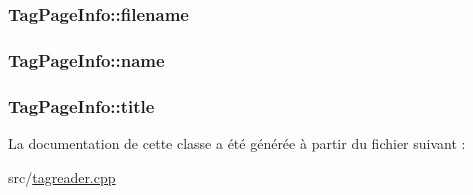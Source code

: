 \subsubsection[{filename}]{ Tag\+Page\+Info\+::filename}\label{class_tag_page_info_a3bf13922e2f0a86a2e23c3ccb72c84df}
\hypertarget{class_tag_page_info_a2e57641a6ce6bd580af7e2b432ed7ca5}{}
\subsubsection[{name}]{ Tag\+Page\+Info\+::name}\label{class_tag_page_info_a2e57641a6ce6bd580af7e2b432ed7ca5}
\hypertarget{class_tag_page_info_a81c788a940f2a63663938bb5d4339062}{}
\subsubsection[{title}]{ Tag\+Page\+Info\+::title}\label{class_tag_page_info_a81c788a940f2a63663938bb5d4339062}


La documentation de cette classe a été générée à partir du fichier suivant \+:\begin{DoxyCompactItemize}
\item 
src/\hyperlink{tagreader_8cpp}{tagreader.\+cpp}\end{DoxyCompactItemize}
